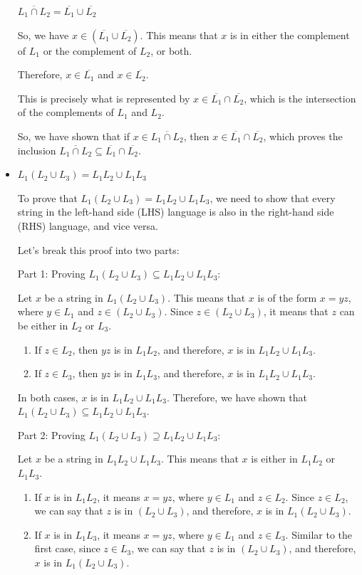 \documentclass{article}
\begin{document}
\begin{itemize}
  $\overline{L_1 \cap L_2} = \overline{L_1} \cup \overline{L_2}$
  
  So, we have $x \in (\overline{L_1} \cup \overline{L_2})$. This means that $x$ is in either the complement of $L_1$ or the complement of $L_2$, or both.
  
  Therefore, $x \in \overline{L_1}$ and $x \in \overline{L_2}$.
  
  This is precisely what is represented by $x \in \overline{L_1} \cap \overline{L_2}$, which is the intersection of the complements of $L_1$ and $L_2$.
  
  So, we have shown that if $x \in \overline{L_1 \cap L_2}$, then $x \in \overline{L_1} \cap \overline{L_2}$, which proves the inclusion $\overline{L_1 \cap L_2} \subseteq \overline{L_1} \cap \overline{L_2}$.

  \item $L_1(L_2 \cup L_3) = L_1L_2 \cup L_1L_3$
  
  To prove that $L_1(L_2 \cup L_3) = L_1L_2 \cup L_1L_3$, we need to show that every string in the left-hand side (LHS) language is also in the right-hand side (RHS) language, and vice versa.

  Let's break this proof into two parts:
  
  Part 1: Proving $L_1(L_2 \cup L_3) \subseteq L_1L_2 \cup L_1L_3$:
  
  Let $x$ be a string in $L_1(L_2 \cup L_3)$. This means that $x$ is of the form $x = yz$, where $y \in L_1$ and $z \in (L_2 \cup L_3)$. Since $z \in (L_2 \cup L_3)$, it means that $z$ can be either in $L_2$ or $L_3$.
  
  \begin{enumerate}
    \item If $z \in L_2$, then $yz$ is in $L_1L_2$, and therefore, $x$ is in $L_1L_2 \cup L_1L_3$.
    
    \item If $z \in L_3$, then $yz$ is in $L_1L_3$, and therefore, $x$ is in $L_1L_2 \cup L_1L_3$.
  \end{enumerate}
  
  In both cases, $x$ is in $L_1L_2 \cup L_1L_3$. Therefore, we have shown that $L_1(L_2 \cup L_3) \subseteq L_1L_2 \cup L_1L_3$.
  
  Part 2: Proving $L_1(L_2 \cup L_3) \supseteq L_1L_2 \cup L_1L_3$:
  
  Let $x$ be a string in $L_1L_2 \cup L_1L_3$. This means that $x$ is either in $L_1L_2$ or $L_1L_3$.
  
  \begin{enumerate}
    \item If $x$ is in $L_1L_2$, it means $x = yz$, where $y \in L_1$ and $z \in L_2$. Since $z \in L_2$, we can say that $z$ is in $(L_2 \cup L_3)$, and therefore, $x$ is in $L_1(L_2 \cup L_3)$.
    \item If $x$ is in $L_1L_3$, it means $x = yz$, where $y \in L_1$ and $z \in L_3$. Similar to the first case, since $z \in L_3$, we can say that $z$ is in $(L_2 \cup L_3)$, and therefore, $x$ is in $L_1(L_2 \cup L_3)$.
  \end{enumerate}
  

\end{itemize}
\end{document}
